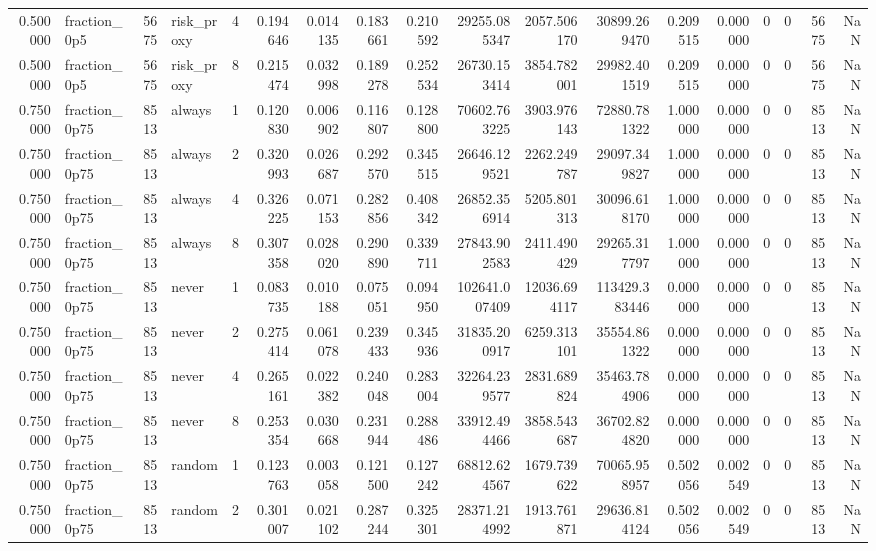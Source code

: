 \begin{tabular}{rlrlrrrrrrrrrrrrrr}
0.500000 & fraction\_0p5 & 5675 & risk\_proxy & 4 & 0.194646 & 0.014135 & 0.183661 & 0.210592 & 29255.085347 & 2057.506170 & 30899.269470 & 0.209515 & 0.000000 & 0 & 0 & 5675 & NaN \\
0.500000 & fraction\_0p5 & 5675 & risk\_proxy & 8 & 0.215474 & 0.032998 & 0.189278 & 0.252534 & 26730.153414 & 3854.782001 & 29982.401519 & 0.209515 & 0.000000 & 0 & 0 & 5675 & NaN \\
0.750000 & fraction\_0p75 & 8513 & always & 1 & 0.120830 & 0.006902 & 0.116807 & 0.128800 & 70602.763225 & 3903.976143 & 72880.781322 & 1.000000 & 0.000000 & 0 & 0 & 8513 & NaN \\
0.750000 & fraction\_0p75 & 8513 & always & 2 & 0.320993 & 0.026687 & 0.292570 & 0.345515 & 26646.129521 & 2262.249787 & 29097.349827 & 1.000000 & 0.000000 & 0 & 0 & 8513 & NaN \\
0.750000 & fraction\_0p75 & 8513 & always & 4 & 0.326225 & 0.071153 & 0.282856 & 0.408342 & 26852.356914 & 5205.801313 & 30096.618170 & 1.000000 & 0.000000 & 0 & 0 & 8513 & NaN \\
0.750000 & fraction\_0p75 & 8513 & always & 8 & 0.307358 & 0.028020 & 0.290890 & 0.339711 & 27843.902583 & 2411.490429 & 29265.317797 & 1.000000 & 0.000000 & 0 & 0 & 8513 & NaN \\
0.750000 & fraction\_0p75 & 8513 & never & 1 & 0.083735 & 0.010188 & 0.075051 & 0.094950 & 102641.007409 & 12036.694117 & 113429.383446 & 0.000000 & 0.000000 & 0 & 0 & 8513 & NaN \\
0.750000 & fraction\_0p75 & 8513 & never & 2 & 0.275414 & 0.061078 & 0.239433 & 0.345936 & 31835.200917 & 6259.313101 & 35554.861322 & 0.000000 & 0.000000 & 0 & 0 & 8513 & NaN \\
0.750000 & fraction\_0p75 & 8513 & never & 4 & 0.265161 & 0.022382 & 0.240048 & 0.283004 & 32264.239577 & 2831.689824 & 35463.784906 & 0.000000 & 0.000000 & 0 & 0 & 8513 & NaN \\
0.750000 & fraction\_0p75 & 8513 & never & 8 & 0.253354 & 0.030668 & 0.231944 & 0.288486 & 33912.494466 & 3858.543687 & 36702.824820 & 0.000000 & 0.000000 & 0 & 0 & 8513 & NaN \\
0.750000 & fraction\_0p75 & 8513 & random & 1 & 0.123763 & 0.003058 & 0.121500 & 0.127242 & 68812.624567 & 1679.739622 & 70065.958957 & 0.502056 & 0.002549 & 0 & 0 & 8513 & NaN \\
0.750000 & fraction\_0p75 & 8513 & random & 2 & 0.301007 & 0.021102 & 0.287244 & 0.325301 & 28371.214992 & 1913.761871 & 29636.814124 & 0.502056 & 0.002549 & 0 & 0 & 8513 & NaN \\

\end{tabular}
